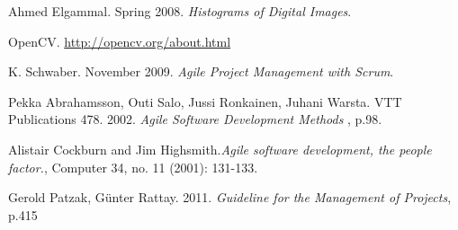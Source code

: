 \begin{thebibliography}{}
 Ahmed Elgammal. Spring 2008. \emph{Histograms of Digital Images}.


 OpenCV. \url{http://opencv.org/about.html}




 K. Schwaber. November 2009. \emph{Agile Project Management with Scrum}.

 Pekka Abrahamsson, Outi Salo, Jussi Ronkainen, Juhani Warsta. VTT Publications 478. 2002. \emph{Agile Software Development Methods} , p.98.

 Alistair Cockburn and Jim Highsmith.\emph{Agile software development, the people factor.}, Computer 34, no. 11 (2001): 131-133.

 Gerold Patzak, Günter Rattay. 2011. \emph{Guideline for the Management of Projects}, p.415



\end{thebibliography}